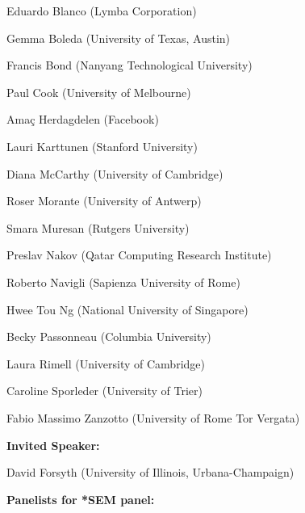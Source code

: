 \begin{description}
\begin{description}
  Eduardo Blanco (Lymba Corporation)

  Gemma Boleda (University of Texas, Austin)

  Francis Bond (Nanyang Technological University)

  Paul Cook (University of Melbourne)

  Amaç Herdagdelen (Facebook)

  Lauri Karttunen (Stanford University)

  Diana McCarthy (University of Cambridge)

  Roser Morante (University of Antwerp)

  Smara Muresan (Rutgers University)

  Preslav Nakov (Qatar Computing Research Institute)

  Roberto Navigli (Sapienza University of Rome)

  Hwee Tou Ng (National University of Singapore)

  Becky Passonneau (Columbia University)

  Laura Rimell (University of Cambridge)

  Caroline Sporleder (University of Trier)

  Fabio Massimo Zanzotto (University of Rome Tor Vergata)

\end{description}


%

\vspace{3mm}
\item{\bf Invited Speaker:}  %

  David Forsyth (University of Illinois, Urbana-Champaign)

\item{\bf Panelists for *SEM panel: }


\end{description}
